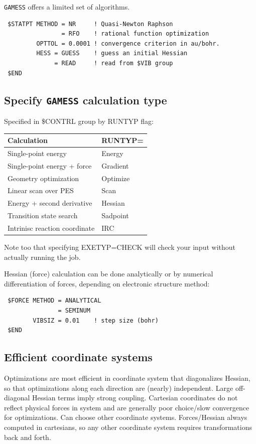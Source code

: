 \documentclass[11pt]{article}
\begin{document}
\texttt{GAMESS} offers a limited set of algorithms.
\begin{verbatim}
 $STATPT METHOD = NR     ! Quasi-Newton Raphson
                = RFO    ! rational function optimization
         OPTTOL = 0.0001 ! convergence criterion in au/bohr.
         HESS = GUESS    ! guess an initial Hessian
              = READ     ! read from $VIB group
 $END
\end{verbatim}

\subsection{Specify \texttt{GAMESS} calculation type}
\label{sec:org43d98c9}
Specified in \$CONTRL group by RUNTYP flag:

\begin{center}
\begin{tabular}{ll}
Calculation & RUNTYP=\\
\hline
Single-point energy & Energy\\
Single-point energy + force & Gradient\\
Geometry optimization & Optimize\\
Linear scan over PES & Scan\\
Energy + second derivative & Hessian\\
Transition state search & Sadpoint\\
Intrinisc reaction coordinate & IRC\\
\end{tabular}
\end{center}

Note too that specifying EXETYP=CHECK will check your input without actually running the job.

Hessian (force) calculation can be done analytically or by numerical differentiation of forces, depending on electronic structure method:
\begin{verbatim}
 $FORCE METHOD = ANALYTICAL
               = SEMINUM
        VIBSIZ = 0.01    ! step size (bohr)
 $END
\end{verbatim}

\subsection{Efficient coordinate systems}
\label{sec:orgf05d55a}
Optimizations are most efficient in coordinate system that diagonalizes Hessian, so that optimizations along each direction are (nearly) independent.  Large off-diagonal Hessian terms imply strong coupling.  Cartesian coordinates do not reflect physical forces in system and are generally poor choice/slow convergence for optimizations. Can choose other coordinate systems. Forces/Hessian always computed in cartesians, so any other coordinate system requires transformations back and forth.
\end{document}
